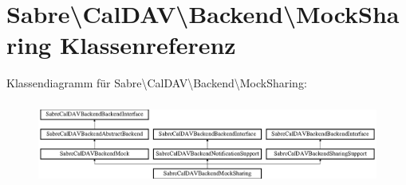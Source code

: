 \hypertarget{class_sabre_1_1_cal_d_a_v_1_1_backend_1_1_mock_sharing}{}\section{Sabre\textbackslash{}Cal\+D\+AV\textbackslash{}Backend\textbackslash{}Mock\+Sharing Klassenreferenz}
\label{class_sabre_1_1_cal_d_a_v_1_1_backend_1_1_mock_sharing}
Klassendiagramm für Sabre\textbackslash{}Cal\+D\+AV\textbackslash{}Backend\textbackslash{}Mock\+Sharing\+:\begin{figure}[H]
\begin{center}
\leavevmode
\includegraphics[height=2.786070cm]{class_sabre_1_1_cal_d_a_v_1_1_backend_1_1_mock_sharing}
\end{center}
\end{figure}
